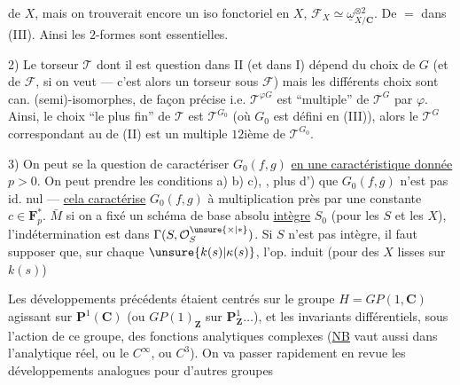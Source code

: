  de $X$, mais on trouverait encore
un iso fonctoriel en $X$, $\mathcal{F}_X\simeq\underline{\omega}_{X/\mathbf{C}}^{\otimes2}$.
De $=$ dans (III). Ainsi les $2$-formes sont essentielles.

2)  Le torseur $\mathcal{T}$ dont il est question dans
II (et  dans I) dépend du choix de
$G$ (et de $\mathcal{F}$, si on veut --- c'est alors un
torseur sous $\mathcal{F}$) mais les  différents choix
sont can. (semi)-isomorphes, de façon précise
i.e. $\mathcal{T}^{\varphi G}$ est ``multiple'' de $\mathcal{T}^{G}$ par $\varphi$.
Ainsi, le choix ``le plus fin'' de $\mathcal{T}$ est $\mathcal{T}^{G_0}$
(où $G_0$ est défini en (III)), alors le $\mathcal{T}^{G}$
correspondant au   de (II) est un
multiple $12$ième de $\mathcal{T}^{G_0}$.

3) On peut se  la question
de caractériser $G_0(f,g)$ \uline{en une caractéristique donnée} $p>0$.
On peut prendre les conditions
a) b) c), , plus d') que $G_0(f,g)$ n'est pas id. nul
--- \uline{cela caractérise} $G_0(f,g)$ à multiplication près
par une constante $c\in\mathbf{F}_p^{*}$.
$\bar{M}$  si
on a fixé un schéma de base absolu
\uline{intègre} $S_0$ (pour les $S$ et les $X$), l'indétermination
est dans $\Gamma(S,\mathcal{O}_S^{\unsure{\times|*}})$.
Si $S$ n'est pas intègre, il faut supposer que, sur chaque
$\unsure{k(s)|\kappa(s)}$, l'op. induit (pour des $X$ lisses
 sur $k(s)$)


Les développements précédents étaient centrés
sur le groupe $H=GP(1,\mathbf{C})$ agissant sur $\mathbf{P}^{1}(\mathbf{C})$
(ou $GP(1)_{\mathbf{Z}}$ sur $\mathbf{P}^{1}_{\mathbf{Z}}\ldots$), et les invariants
différentiels, sous l'action de ce groupe, des
fonctions analytiques complexes (\uline{NB} 
vaut aussi dans l'analytique réel, ou le
$C^{\infty}$, ou $C^3$).
On va passer rapidement en revue les développements
analogues pour d'autres groupes

